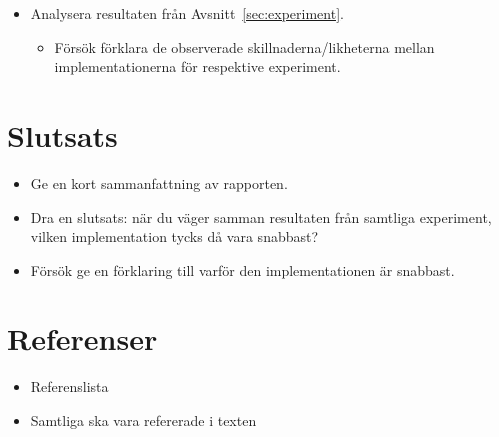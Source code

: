 \documentclass[a4paper,12pt]{article}
\newcommand{\todo}[1]{{\color{red} #1}}
\begin{document}
\begin{itemize}
\item \todo{Analysera resultaten från Avsnitt~\ref{sec:experiment}.}
  \begin{itemize}
  \item \todo{Försök förklara de observerade skillnaderna/likheterna mellan implementationerna för respektive experiment.}
  \end{itemize}
\end{itemize}


\section{Slutsats}
\label{sec:slutsats}

\begin{itemize}
\item \todo{Ge en kort sammanfattning av rapporten.}
\item \todo{Dra en slutsats: när du väger samman resultaten från samtliga experiment, vilken implementation tycks då vara snabbast?}
\item \todo{Försök ge en förklaring till varför den implementationen är snabbast.}
\end{itemize}



\section*{Referenser}
\label{sec:referenser}

\begin{itemize}
\item \todo{Referenslista}
\item \todo{Samtliga ska vara refererade i texten}
\end{itemize}
\end{document}
